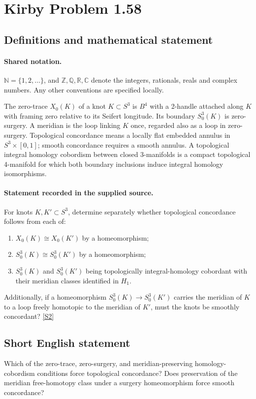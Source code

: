 \documentclass[11pt]{article}
\newcommand{\sref}[2]{\hyperlink{source:#1:#2}{[S#2]}}
\begin{document}
\section{Kirby Problem 1.58}\label{statement}

\subsection{Definitions and mathematical statement}

\paragraph{Shared notation.}$\mathbb N=\{1,2,\ldots\}$, and $\mathbb Z,\mathbb Q,\mathbb R,\mathbb C$ denote the integers, rationals, reals and complex numbers. Any other conventions are specified locally.


The zero-trace $X_0(K)$ of a knot $K\subset S^3$ is $B^4$ with a 2-handle attached along $K$ with framing zero relative to its Seifert longitude. Its boundary $S^3_0(K)$ is zero-surgery. A meridian is the loop linking $K$ once, regarded also as a loop in zero-surgery. Topological concordance means a locally flat embedded annulus in $S^3\times[0,1]$; smooth concordance requires a smooth annulus. A topological integral homology cobordism between closed 3-manifolds is a compact topological 4-manifold for which both boundary inclusions induce integral homology isomorphisms.
\paragraph{Statement recorded in the supplied source.}
For knots $K,K'\subset S^3$, determine separately whether topological concordance follows from each of:
\begin{enumerate}
\item $X_0(K)\cong X_0(K')$ by a homeomorphism;
\item $S^3_0(K)\cong S^3_0(K')$ by a homeomorphism;
\item $S^3_0(K)$ and $S^3_0(K')$ being topologically integral-homology cobordant with their meridian classes identified in $H_1$.
\end{enumerate}
Additionally, if a homeomorphism $S^3_0(K)\to S^3_0(K')$ carries the meridian of $K$ to a loop freely homotopic to the meridian of $K'$, must the knots be smoothly concordant? \sref{statement}{2}

\subsection{Short English statement}
Which of the zero-trace, zero-surgery, and meridian-preserving homology-cobordism conditions force topological concordance? Does preservation of the meridian free-homotopy class under a surgery homeomorphism force smooth concordance?
\end{document}

